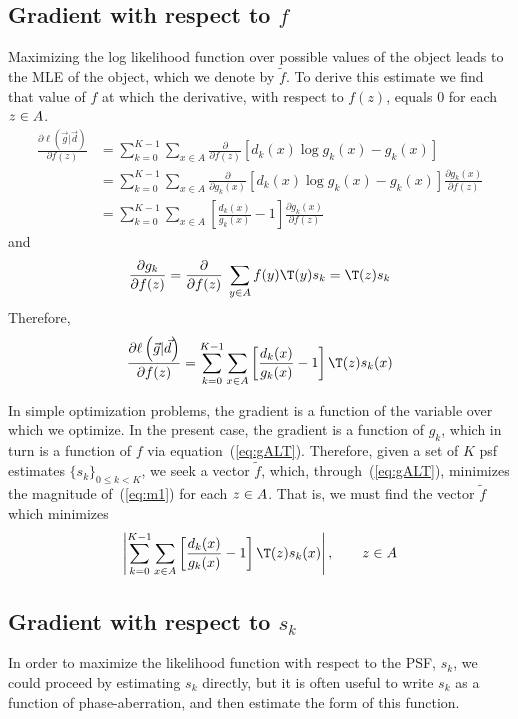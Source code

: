 \subsection{Gradient with respect to $f$}
Maximizing the log likelihood function over possible values of the
object leads to the MLE of the object, which we denote by $\tilde{f}$.
To derive this estimate we find that value of $f$ at which the derivative,
with respect to $f(z)$, equals 0 for each $z \in A$.
\begin{align*}
\frac{\partial \ell\left(\vec{g} |\vec{d}\right)}{\partial f(z)} 
&= \sum_{k=0}^{K-1} \sum_{x\in A} \frac{\partial}{\partial f(z)}\left[ d_k(x)\log g_k(x) - g_k(x)\right]\\
&= \sum_{k=0}^{K-1} \sum_{x\in A} \frac{\partial}{\partial g_k(x)}\left[ d_k(x)\log g_k(x) - g_k(x)\right] \frac{\partial g_k(x)}{\partial f(z)}\\
&= \sum_{k=0}^{K-1} \sum_{x\in A} \left[ \frac{ d_k(x)}{g_k(x)} - 1\right]\frac{\partial g_k(x)}{\partial f(z)} 
\end{align*}
and
\[%
\frac{\partial g_k}{\partial f(z)} = \frac{\partial}{\partial f(z)} \;\sum_{y \in \groupA} f(y)\T(y)s_k
= \T(z)s_k\]
Therefore, 
\begin{equation}\label{eq:m1}
\frac{\partial \ell\left(\vec{g} |\vec{d}\right)}{\partial f(z)} 
= \sum_{k=0}^{K-1} \sum_{x\in A} \left[ \frac{ d_k(x)}{g_k(x)} - 1\right] \T(z)s_k(x)
\end{equation}

In simple optimization problems, the gradient is a
function of the variable over which we optimize.  In the present
case, the gradient is a function of $g_k$, which in turn is a function of $f$ via
equation~(\ref{eq:gALT}).  Therefore, given a set of $K$ psf
estimates $\{s_k\}_{0\leq k < K}$, we seek a vector $\tilde{f}$, %
which, through~(\ref{eq:gALT}), minimizes the magnitude of~(\ref{eq:m1}) for each
$z \in A$.  That is, we must find the vector $\tilde{f}$ which minimizes
\[
\left|
\sum_{k=0}^{K-1} \sum_{x\in A} \left[ \frac{ d_k(x)}{g_k(x)} - 1\right]\T(z) s_k(x)
\right|, \qquad z \in \groupA
\]

\subsection{Gradient with respect to $s_k$}
In order to maximize the likelihood function with respect to the PSF, $s_k$, we
could proceed by estimating $s_k$ directly, but it is often useful to 
write $s_k$ as a function of phase-aberration, and then estimate the form of
this function.
